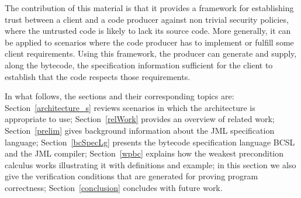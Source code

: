 The contribution of this material is that it provides a framework for establishing trust between a client and a code producer against non trivial security policies, where the untrusted code is likely to lack its source code.
More generally, it can be applied to scenarios where the code producer has to implement or fulfill some client requirements.
Using this framework, the producer can generate and supply, along the bytecode, the specification information sufficient for the client to establish that the code respects those requirements.   

  
In what follows, the sections and their corresponding topics are: 
Section~\ref{architecture_s} reviews scenarios in which the architecture is appropriate to use; Section~\ref{relWork} provides an 
overview of related work; Section~\ref{prelim} gives background information about the JML specification language;  Section~\ref{bcSpecLg} presents the bytecode 
specification language BCSL and the JML compiler; Section~\ref{wpbc} explains how the weakest precondition calculus works illustrating it with definitions and example; in this section we also give the verification conditions that are generated for 
proving program correctness; %
Section~\ref{conclusion} concludes with future work.  















